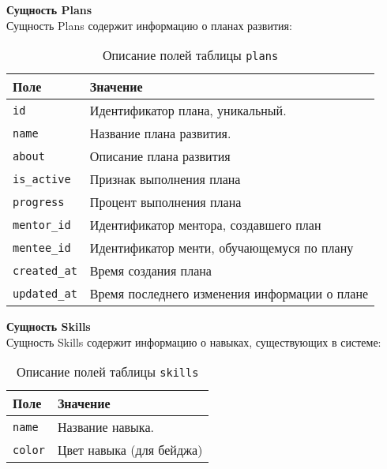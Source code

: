 \newpage
\noindent\textbf{Сущность Plans}\\
Сущность Plans содержит информацию о планах развития:
\begin{table}[!ht]
    \caption{Описание полей таблицы \texttt{plans}}
    \label{tbl:plans}
    \begin{center}
        \begin{tabular}{|p{}p{}|}
            \hline
            \textbf{Поле} & \textbf{Значение} \\\hline
            \texttt{id} & Идентификатор плана, уникальный. \\\hline
            \texttt{name} & Название плана развития. \\\hline
            \texttt{about} & Описание плана развития\\\hline
            \texttt{is\_active} & Признак выполнения плана \\\hline
            \texttt{progress} & Процент выполнения плана \\\hline
            \texttt{mentor\_id} & Идентификатор ментора, создавшего план \\\hline
            \texttt{mentee\_id} & Идентификатор менти, обучающемуся по плану \\\hline
            \texttt{created\_at} & Время создания плана \\\hline
            \texttt{updated\_at} & Время последнего изменения информации о плане \\\hline
        \end{tabular}
    \end{center}
\end{table}

\noindent\textbf{Сущность Skills}\\
Сущность Skills содержит информацию о навыках, существующих в системе:
\begin{table}[!ht]
    \caption{Описание полей таблицы \texttt{skills}}
    \label{tbl:skills}
    \begin{center}
        \begin{tabular}{|p{}p{}|}
            \hline
            \textbf{Поле} & \textbf{Значение} \\\hline
            \texttt{name} & Название навыка. \\\hline
            \texttt{color} & Цвет навыка (для бейджа) \\\hline
        \end{tabular}
    \end{center}
\end{table}

